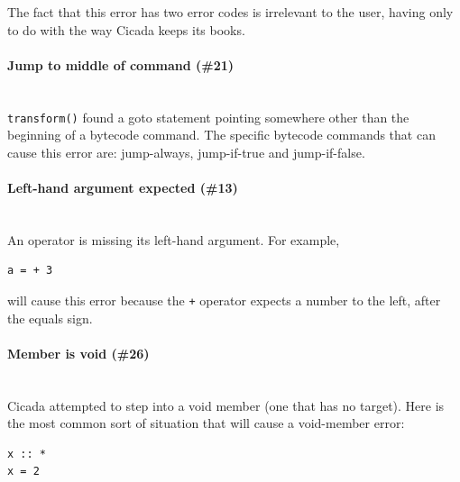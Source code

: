 \documentclass{article}
\newenvironment{code}{
       \begin{list}{}{
               \setlength{\leftmargin}{.4in}
               \setlength{\rightmargin}{0in}
               \setlength{\topsep}{.2in}
       }
       \small
       \item[] }
       { \end{list}   }
\begin{document}
The fact that this error has two error codes is irrelevant to the user, having only to do with the way Cicada keeps its books.\\




\paragraph{Jump to middle of command (\#21)\\\\}

\verb#transform()# found a goto statement pointing somewhere other than the beginning of a bytecode command.  The specific bytecode commands that can cause this error are:  jump-always, jump-if-true and jump-if-false.\\




\paragraph{Left-hand argument expected (\#13)\\\\}

An operator is missing its left-hand argument.  For example,

\begin{code} \begin{verbatim}
a = + 3
\end{verbatim} \end{code}

\noindent will cause this error because the \verb#+# operator expects a number to the left, after the equals sign.\\




\paragraph{Member is void (\#26)\\\\}

Cicada attempted to step into a void member (one that has no target).  Here is the most common sort of situation that will cause a void-member error:

\begin{code} \begin{verbatim}
x :: *
x = 2
\end{verbatim} \end{code}
\end{document}
